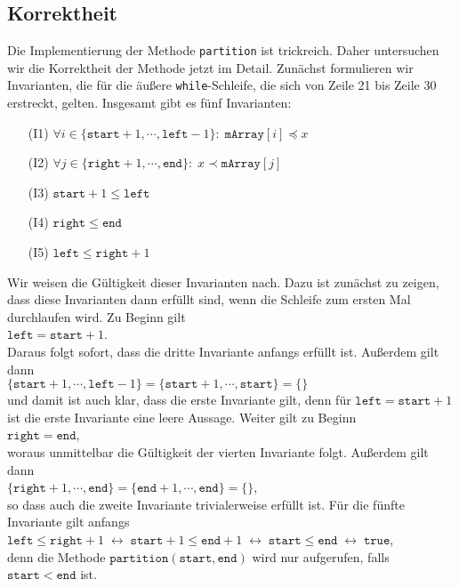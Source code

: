 \subsection{Korrektheit}
Die Implementierung der Methode \texttt{partition} ist trickreich.  Daher untersuchen wir
die Korrektheit der Methode jetzt im Detail.  Zun\"achst formulieren wir Invarianten, die
f\"ur die \"au{\ss}ere \texttt{while}-Schleife, die sich von Zeile 21 bis Zeile 30 erstreckt,
gelten.  Insgesamt gibt es f\"unf Invarianten:
\begin{enumerate}
\item[(I1)] $\forall i \in \{ \mathtt{start}+1, \cdots, \mathtt{left} - 1 \} \colon\; \mathtt{mArray}[i] \preceq x$
\item[(I2)] $\forall j \in \{ \mathtt{right}+1, \cdots, \mathtt{end} \} \colon\; x \prec \mathtt{mArray}[j]$
\item[(I3)] $\mathtt{start}+1 \leq \mathtt{left}$ 
\item[(I4)] $\mathtt{right} \leq \mathtt{end}$ 
\item[(I5)] $\mathtt{left} \leq \mathtt{right} + 1$
\end{enumerate}
Wir weisen die G\"ultigkeit dieser Invarianten nach.  Dazu ist zun\"achst zu zeigen,
dass diese Invarianten dann erf\"ullt sind, wenn die Schleife zum ersten Mal durchlaufen wird.
Zu Beginn gilt \\[0.1cm]
\hspace*{1.3cm} $\texttt{left} = \mathtt{start} + 1$. \\[0.1cm]
Daraus folgt sofort, dass die dritte Invariante anfangs erf\"ullt ist.  Au{\ss}erdem gilt dann \\[0.1cm]
\hspace*{1.3cm} 
$\{ \mathtt{start}+1, \cdots, \mathtt{left}-1 \} = \{ \mathtt{start}+1, \cdots, \mathtt{start} \} = \{\}$
\\[0.1cm]
und damit ist auch klar, dass die erste Invariante gilt, denn f\"ur $\mathtt{left} = \mathtt{start}+1$
ist die erste Invariante eine leere Aussage.  Weiter gilt zu Beginn \\[0.1cm]
\hspace*{1.3cm} $\mathtt{right} = \mathtt{end}$,
\\[0.1cm]
woraus unmittelbar die G\"ultigkeit der vierten Invariante folgt.  Au{\ss}erdem gilt dann \\[0.1cm]
\hspace*{1.3cm} 
$\{ \mathtt{right}+1, \cdots, \mathtt{end} \} = \{ \mathtt{end}+1, \cdots, \mathtt{end} \} = \{\}$,
\\[0.1cm]
so dass auch die zweite Invariante trivialerweise erf\"ullt ist.  F\"ur die f\"unfte Invariante gilt anfangs
 \\[0.1cm]
\hspace*{1.3cm} 
$\mathtt{left} \leq \mathtt{right} + 1 \;\leftrightarrow\; \mathtt{start} + 1 \leq \mathtt{end} + 1 \;\leftrightarrow\;
  \mathtt{start} \leq \mathtt{end} \;\leftrightarrow\; \mathtt{true}$,
\\[0.1cm]
denn die Methode $\texttt{partition}(\texttt{start}, \texttt{end})$ wird nur aufgerufen,
falls $\mathtt{start} < \mathtt{end}$ ist.
\vspace*{0.3cm}

